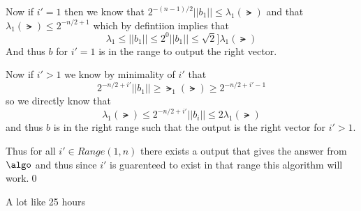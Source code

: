 \documentclass[12pt]{amsart}
\begin{document}
\begin{problem}
    Now if $i'=1$ then we know that $2^{-(n-1)/2}||b_1||\leq \lambda_1(\lat)$ and that $\lambda_1(\lat)\leq 2^{-n/2+1}$  which by defintiion implies that 
    \[\lambda_1\leq ||b_1|| \leq 2^{0}||b_1|| \leq \sqrt{2}]\lambda_1(\lat)\]
    And thus $b$ for $i'=1$ is in the range to output the right vector.

    Now if $i'>1$ we know by minimality of $i'$ that 
    \[2^{-n/2+i'}||b_1||\geq \lat_1(\lat)\geq 2^{-n/2 + i'-1}\]
    so we directly know that 
    \[\lambda_1(\lat) \leq 2^{-n/2+i'}||b_i|| \leq 2 \lambda_1(\lat)\]
    and thus $b$ is in the right range such that the output is the right vector for $i'>1$.

    Thus for all $i'\in Range(1,n)$ there exists a output that gives the answer from $\algo$ and thus since $i'$ is guarenteed to exist in that range this algorithm will work.\qed

  \end{problem}

  \begin{problem}
    A lot like 25 hours 
  \end{problem}
\end{document}
